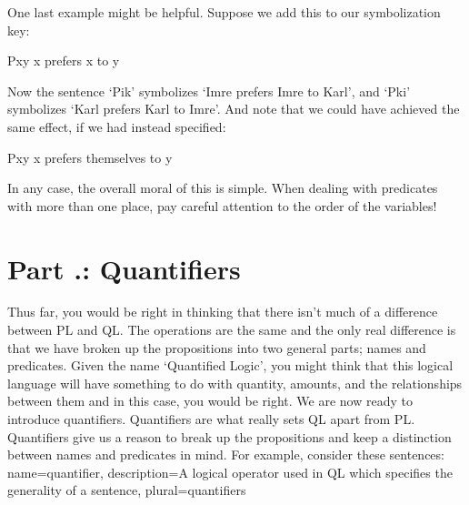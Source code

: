 One last example might be helpful. Suppose we add this to our symbolization key:
\begin{ekey}
\item[Pxy] x prefers x to y
\end{ekey}
Now the sentence ‘Pik’ symbolizes ‘Imre prefers Imre to Karl’, and ‘Pki’ symbolizes ‘Karl prefers Karl to Imre’. And note that we could have achieved the same effect, if we had instead specified:
\begin{ekey}
\item[Pxy] x prefers themselves to y
\end{ekey}
In any case, the overall moral of this is simple. When dealing with predicates with more than one place, pay careful attention to the order of the variables!
\section{Part \thechapcount.\theseccount: Quantifiers}
Thus far, you would be right in thinking that there isn't much of a difference between PL and QL. The operations are the same and the only real difference is that we have broken up the propositions into two general parts; names and predicates. Given the name ‘Quantified Logic', you might think that this logical language will have something to do with quantity, amounts, and the relationships between them and in this case, you would be right. We are now ready to introduce \glspl{quantifier}. Quantifiers are what really sets QL apart from PL. Quantifiers give us a reason to break up the propositions and keep a distinction between names and predicates in mind. For example, consider these sentences:
{
name=quantifier,
description={A logical operator used in QL which specifies the generality of a sentence},
plural=quantifiers
}


